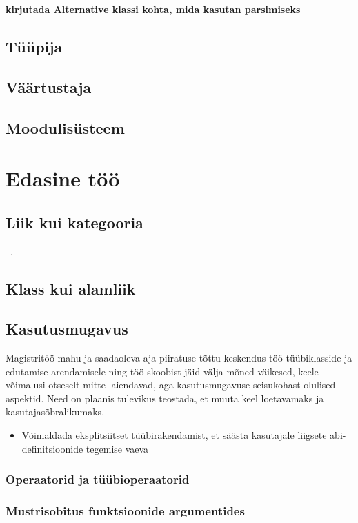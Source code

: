 \documentclass[12pt]{article}
\newcommand\peatykk[1]{
  \clearpage
  \section{#1}}
\newcommand\markus[1]{\textcolor{roheline}{\textbf{#1}}}
\begin{document}
      \markus{kirjutada Alternative klassi kohta, mida kasutan parsimiseks}
    \subsection{Tüüpija}
      
    \subsection{Väärtustaja}
      
    \subsection{Moodulisüsteem}
      
  \peatykk{Edasine töö}
    \subsection{Liik kui kategooria}
      ~\cite{Cat}.
    \subsection{Klass kui alamliik}
      
    \subsection{Kasutusmugavus}
      Magistritöö mahu ja saadaoleva aja piiratuse tõttu keskendus töö tüübiklasside ja edutamise arendamisele ning töö skoobist jäid välja mõned väikesed, keele võimalusi otseselt mitte laiendavad, aga kasutusmugavuse seisukohast olulised aspektid. Need on plaanis tulevikus teostada, et muuta keel loetavamaks ja kasutajasõbralikumaks.
      \begin{itemize}
        \item
          Võimaldada eksplitsiitset tüübirakendamist, et säästa kasutajale liigsete abi-definitsioonide tegemise vaeva
      \end{itemize}
      \subsubsection{Operaatorid ja tüübioperaatorid}
        
      \subsubsection{Mustrisobitus funktsioonide argumentides}
        
\end{document}
